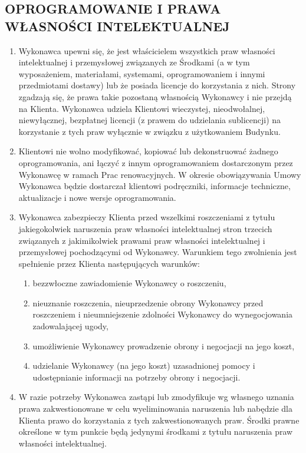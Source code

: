 \begin{multicols}{2}
\subsection{OPROGRAMOWANIE I PRAWA WŁASNOŚCI INTELEKTUALNEJ}
\begin{enumerate}
	\item Wykonawca upewni się, że jest właścicielem wszystkich praw własności intelektualnej i przemysłowej związanych ze Środkami (a w tym wyposażeniem, materiałami, systemami, oprogramowaniem i innymi przedmiotami dostawy) lub że posiada licencje do korzystania z nich. Strony zgadzają się, że prawa takie pozostaną własnością Wykonawcy i nie przejdą na Klienta. Wykonawca udziela Klientowi wieczystej, nieodwołalnej, niewyłącznej, bezpłatnej licencji (z prawem do udzielania sublicencji) na korzystanie z tych praw wyłącznie w związku z użytkowaniem Budynku.
	\item Klientowi nie wolno modyfikować, kopiować lub dekonstruować żadnego oprogramowania, ani łączyć z innym oprogramowaniem dostarczonym przez Wykonawcę w ramach Prac renowacyjnych. W okresie obowiązywania Umowy Wykonawca będzie dostarczał klientowi podręczniki, informacje techniczne, aktualizacje i nowe wersje oprogramowania.
	\item Wykonawca zabezpieczy Klienta przed wszelkimi roszczeniami z tytułu jakiegokolwiek naruszenia praw własności intelektualnej stron trzecich związanych z jakimikolwiek prawami praw własności intelektualnej i przemysłowej pochodzącymi od Wykonawcy. Warunkiem tego zwolnienia jest spełnienie przez Klienta następujących warunków:
	\begin{enumerate}
		\item bezzwłoczne zawiadomienie Wykonawcy o roszczeniu,
		\item nieuznanie roszczenia, nieuprzedzenie obrony Wykonawcy przed roszczeniem i nieumniejszenie zdolności Wykonawcy do wynegocjowania zadowalającej ugody,
		\item umożliwienie Wykonawcy prowadzenie obrony i negocjacji na jego koszt,
		\item udzielanie Wykonawcy (na jego koszt) uzasadnionej pomocy i udostępnianie informacji na potrzeby obrony i negocjacji.
	\end{enumerate}
	\item W razie potrzeby Wykonawca zastąpi lub zmodyfikuje wg własnego uznania prawa zakwestionowane w celu wyeliminowania naruszenia lub nabędzie dla Klienta prawo do korzystania z tych zakwestionowanych praw. Środki prawne określone w tym punkcie będą jedynymi środkami z tytułu naruszenia praw własności intelektualnej.
\end{enumerate}


\end{multicols}
